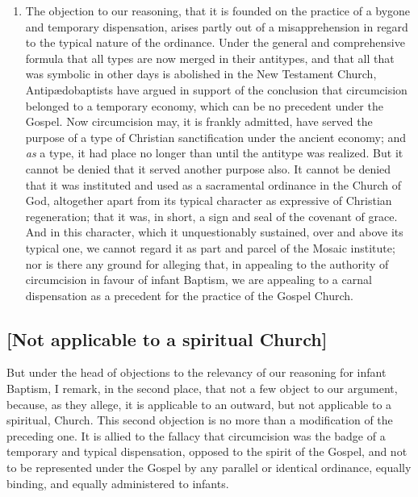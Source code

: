 \documentclass[
  english,
]{book}
\providecommand{\tightlist}{%
  \setlength{\itemsep}{0pt}\setlength{\parskip}{0pt}}
\begin{document}
\begin{enumerate}
\end{enumerate}

\begin{enumerate}
\def\labelenumi{\arabic{enumi}.}
\setcounter{enumi}{1}
\tightlist
\item
  The objection to our reasoning, that it is founded on the practice of a bygone and temporary dispensation, arises partly out of a misapprehension in regard to the typical nature of the ordinance. Under the general and comprehensive formula that all types are now merged in their antitypes, and that all that was symbolic in other days is abolished in the New Testament Church, Antipædobaptists have argued in support of the conclusion that circumcision belonged to a temporary economy, which can be no precedent under the Gospel. Now circumcision may, it is frankly admitted, have served the purpose of a type of Christian sanctification under the ancient economy; and \emph{as} a type, it had place no longer than until the antitype was realized. But it cannot be denied that it served another purpose also. It cannot be denied that it was instituted and used as a sacramental ordinance in the Church of God, altogether apart from its typical character as expressive of Christian regeneration; that it was, in short, a sign and seal of the covenant of grace. And in this character, which it unquestionably sustained, over and above its typical one, we cannot regard it as part and parcel of the Mosaic institute; nor is there any ground for alleging that, in appealing to the authority of circumcision in favour of infant Baptism, we are appealing to a carnal dispensation as a precedent for the practice of the Gospel Church.
\end{enumerate}

\hypertarget{not-applicable-to-a-spiritual-church}{%
\subsection{{[}Not applicable to a spiritual Church{]}}\label{not-applicable-to-a-spiritual-church}}

But under the head of objections to the relevancy of our reasoning for infant Baptism, I remark, in the second place, that not a few object to our argument, because, as they allege, it is applicable to an outward, but not applicable to a spiritual, Church. This second objection is no more than a modification of the preceding one. It is allied to the fallacy that circumcision was the badge of a temporary and typical dispensation, opposed to the spirit of the Gospel, and not to be represented under the Gospel by any parallel or identical ordinance, equally binding, and equally administered to infants.
\end{document}
